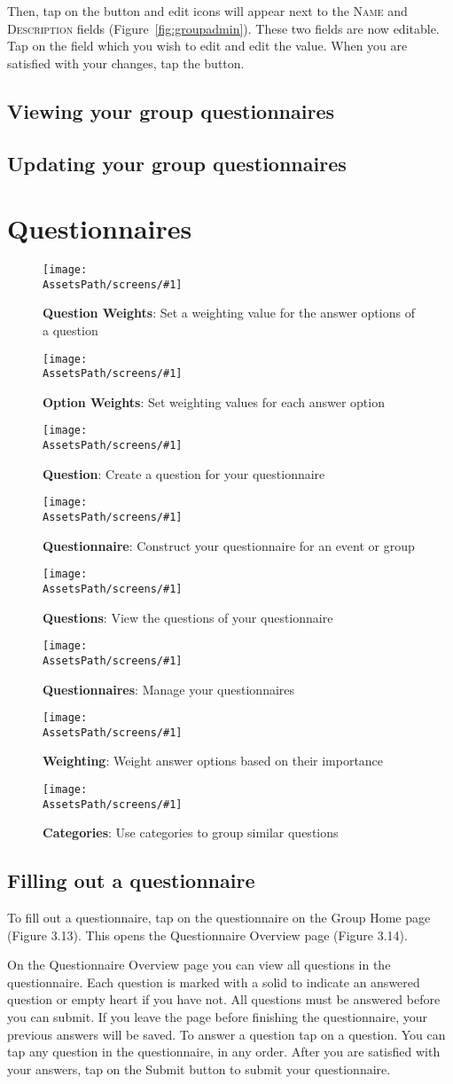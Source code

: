 \documentclass[a4paper,11pt,titlepage]{scrartcl}
\newcommand{\textvar}[1]{{\textsc{#1}}}
\newcommand{\textaction}[1]{{\fontfamily{cmtt}\selectfont#1}}
\newcommand{\action}[1]{\textaction{#1}}
\newcommand*{\fileMatchingTypeOne}{question-matching-1}
\newcommand*{\fileMatchingTypeTwo}{question-matching-2}
\newcommand*{\fileQuestion}{question-editing}
\newcommand*{\fileQuestionnaire}{questionnaire-details}
\newcommand*{\fileQuestions}{questionnaire-questions}
\newcommand*{\fileQuestionnaires}{questionnaires}
\newcommand*{\fileWeighting}{question-weighting}
\newcommand*{\fileCategories}{categories}
\newcommand*{\AssetsPath}{../assets}%
\newcommand{\appscreenshot}[4]{
	\begin{figure}[ht!]%
	\label{#4}%
	\texttt{[image: \\AssetsPath/screens/\#1]}%
	\centering%
	\caption{\textbf{#2}: #3}%
	\end{figure}%
}
\begin{document}
Then, \action{tap} on the  button and edit icons will appear next to the \textvar{Name} and \textvar{Description} fields (Figure~\ref{fig:groupadmin}). These two fields are now editable. \action{Tap} on the field which you wish to edit and edit the value.  When you are satisfied with your changes, \action{tap} the  button.

\subsection{Viewing your group questionnaires}
\label{sec:group-questionnaire}

\subsection{Updating your group questionnaires}
\label{sec:group-questionnaire-edit}

\clearpage
\section{Questionnaires}
\label{sec:questionnaires}
\appscreenshot{\fileMatchingTypeOne}{Question Weights}{Set a weighting value for the answer options of a question}{fig:questionweight}
\appscreenshot{\fileMatchingTypeTwo}{Option Weights}{Set weighting values for each answer option}{fig:optionweight}
\appscreenshot{\fileQuestion}{Question}{Create a question for your questionnaire}{fig:question}
\appscreenshot{\fileQuestionnaire}{Questionnaire}{Construct your questionnaire for an event or group}{fig:questionnaire}
\appscreenshot{\fileQuestions}{Questions}{View the questions of your questionnaire}{fig:questions}
\appscreenshot{\fileQuestionnaires}{Questionnaires}{Manage your questionnaires}{fig:questionnaires}
\appscreenshot{\fileWeighting}{Weighting}{Weight answer options based on their importance}{fig:weighting}
\appscreenshot{\fileCategories}{Categories}{Use categories to group similar questions}{fig:categories}
\subsection{Filling out a questionnaire}
\label{sec:questionnaire-fill}
To fill out a questionnaire, tap on the questionnaire on the Group Home page (Figure 3.13). This opens the Questionnaire Overview page (Figure 3.14). 

On the Questionnaire Overview page you can view all questions in the questionnaire.  Each question is marked with a solid   to indicate an answered question or empty heart   if you have not.  All questions must be answered before you can submit.  If you leave the page before finishing the questionnaire, your previous answers will be saved. To answer a question tap on a question.  You can tap any question in the questionnaire, in any order.  After you are satisfied with your answers, tap on the Submit button to submit your questionnaire.  
\end{document}
